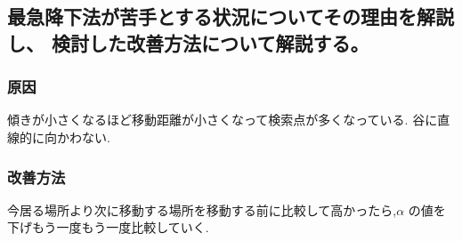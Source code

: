 \subsection{最急降下法が苦手とする状況についてその理由を解説し、
検討した改善方法について解説する。}
\subsubsection{原因}
傾きが小さくなるほど移動距離が小さくなって検索点が多くなっている.
谷に直線的に向かわない.
\subsubsection{改善方法}
今居る場所より次に移動する場所を移動する前に比較して高かったら,$\alpha$
の値を下げもう一度もう一度比較していく.

